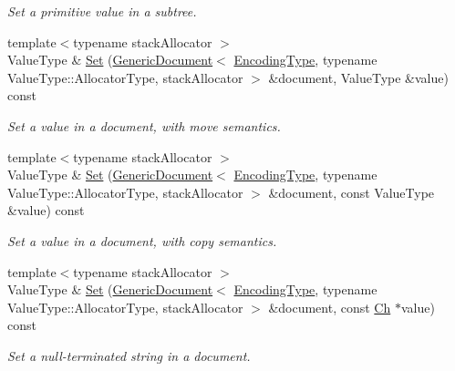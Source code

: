 \begin{DoxyCompactItemize}
\begin{DoxyCompactList}\small\item\em Set a primitive value in a subtree. \end{DoxyCompactList}\item 
\mbox{\label{a02232_aeec3daf051dfa8b8fbf23ea4f9a238e4}} 
{\footnotesize template$<$typename stack\+Allocator $>$ }\\Value\+Type \& \hyperlink{a02232_aeec3daf051dfa8b8fbf23ea4f9a238e4}{Set} (\hyperlink{a01996}{Generic\+Document}$<$ \hyperlink{a02232_a4b802da797a7a0b615fd9611cedb7c3b}{Encoding\+Type}, typename Value\+Type\+::\+Allocator\+Type, stack\+Allocator $>$ \&document, Value\+Type \&value) const
\begin{DoxyCompactList}\small\item\em Set a value in a document, with move semantics. \end{DoxyCompactList}\item 
\mbox{\label{a02232_a8ed0a7ce95331b7433371df7150b84a9}} 
{\footnotesize template$<$typename stack\+Allocator $>$ }\\Value\+Type \& \hyperlink{a02232_a8ed0a7ce95331b7433371df7150b84a9}{Set} (\hyperlink{a01996}{Generic\+Document}$<$ \hyperlink{a02232_a4b802da797a7a0b615fd9611cedb7c3b}{Encoding\+Type}, typename Value\+Type\+::\+Allocator\+Type, stack\+Allocator $>$ \&document, const Value\+Type \&value) const
\begin{DoxyCompactList}\small\item\em Set a value in a document, with copy semantics. \end{DoxyCompactList}\item 
\mbox{\label{a02232_abaa0cda4ed84a4435871d355279bab8e}} 
{\footnotesize template$<$typename stack\+Allocator $>$ }\\Value\+Type \& \hyperlink{a02232_abaa0cda4ed84a4435871d355279bab8e}{Set} (\hyperlink{a01996}{Generic\+Document}$<$ \hyperlink{a02232_a4b802da797a7a0b615fd9611cedb7c3b}{Encoding\+Type}, typename Value\+Type\+::\+Allocator\+Type, stack\+Allocator $>$ \&document, const \hyperlink{a02232_ab292356c11b4015c98d21b966b11f285}{Ch} $\ast$value) const
\begin{DoxyCompactList}\small\item\em Set a null-\/terminated string in a document. \end{DoxyCompactList}\item 

\end{DoxyCompactItemize}
